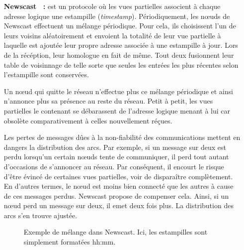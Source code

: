 \begin{itemize}
\item [\textbf{Newscast~\cite{tolgyeski2009adaptive} :}] est un protocole où les
  vues partielles associent à chaque adresse logique une estampille
  (\emph{timestamp}). Périodiquement, les nœuds de Newscast effectuent un
  mélange périodique. Pour cela, ils choisissent l'un de leurs voisins
  aléatoirement et envoient la totalité de leur vue partielle à laquelle est
  ajoutée leur propre adresse associée à une estampille à jour. Lors de la
  récéption, leur homologue en fait de même. Tout deux fusionnent leur table de
  voisinnage de telle sorte que seules les entrées les plus récentes selon
  l'estampille sont conservées.

  Un nœud qui quitte le réseau n'effectue plus ce mélange périodique et ainsi
  n'annonce plus sa présence au reste du réseau. Petit à petit, les vues
  partielles le contenant se débarassent de l'adresse logique menant à lui car
  obsolète comparativement à celles nouvellement réçues.

  Les pertes de messages dûes à la non-fiabilité des communications mettent en
  dangers la distribution des arcs. Par exemple, si un message sur deux est
  perdu lorsqu'un certain nœuds tente de communiquer, il perd tout autant
  d'occasions de s'annoncer au réseau. Par conséquent, il encourt le risque
  d'être évincé de certaines vues partielles, voir de disparaître
  complètement. En d'autres termes, le nœud est moins bien connecté que les
  autres à cause de ces messages perdus. Newscast propose de compenser
  cela. Ainsi, si un nœud perd un message sur deux, il emet deux fois plus. La
  distribution des arcs s'en trouve ajustée.

  \begin{figure}
    \centering
    \hspace{35pt}
    \caption{\label{net:fig:newscastexample} Exemple de mélange dans
      Newscast. Ici, les estampilles sont simplement formatées hh:mm.}
  \end{figure}


\end{itemize}
